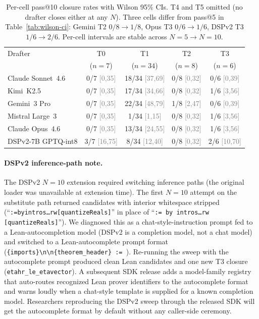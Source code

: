 \begin{table}[!t]
\centering
\small
\caption{Per-cell pass@10 closure rates with Wilson 95\% CIs.
T4 and T5 omitted (no drafter closes either at any $N$). Three
cells differ from pass@5 in Table~\ref{tab:wilson-ci}: Gemini T2
$0/8 \to 1/8$, Opus T3 $0/6 \to 1/6$, DSPv2 T3 $1/6 \to 2/6$.
Per-cell intervals are stable across $N=5 \to N=10$.}
\label{tab:wilson-ci-n10}
\begin{tabular}{l|cccc}
\toprule
Drafter & T0 & T1 & T2 & T3 \\
& ($n=7$) & ($n=34$) & ($n=8$) & ($n=6$) \\
\midrule
Claude Sonnet~4.6 & 0/7 \textcolor{gray}{[0,35]} & 18/34 \textcolor{gray}{[37,69]} & 0/8 \textcolor{gray}{[0,32]} & 0/6 \textcolor{gray}{[0,39]} \\
Kimi~K2.5 & 0/7 \textcolor{gray}{[0,35]} & 17/34 \textcolor{gray}{[34,66]} & 0/8 \textcolor{gray}{[0,32]} & 1/6 \textcolor{gray}{[3,56]} \\
Gemini~3 Pro & 0/7 \textcolor{gray}{[0,35]} & 22/34 \textcolor{gray}{[48,79]} & 1/8 \textcolor{gray}{[2,47]} & 0/6 \textcolor{gray}{[0,39]} \\
Mistral Large~3 & 0/7 \textcolor{gray}{[0,35]} & 1/34 \textcolor{gray}{[1,15]} & 0/8 \textcolor{gray}{[0,32]} & 1/6 \textcolor{gray}{[3,56]} \\
Claude Opus~4.6 & 0/7 \textcolor{gray}{[0,35]} & 13/34 \textcolor{gray}{[24,55]} & 0/8 \textcolor{gray}{[0,32]} & 1/6 \textcolor{gray}{[3,56]} \\
DSPv2-$7$B GPTQ-int$8$ & 3/7 \textcolor{gray}{[16,75]} & 8/34 \textcolor{gray}{[12,40]} & 0/8 \textcolor{gray}{[0,32]} & 2/6 \textcolor{gray}{[10,70]} \\
\bottomrule
\end{tabular}

\end{table}

\paragraph{DSPv2 inference-path note.}
The DSPv2 $N=10$ extension required switching inference paths
(the original loader was unavailable at extension time). The first
$N=10$ attempt on the substitute path returned candidates with
interior whitespace stripped
(``\texttt{:=byintros\dots rw[quantizeReals]}'' in place of
``\texttt{:= by intros\dots rw [quantizeReals]}''). We diagnosed
this as a chat-style-instruction prompt fed to a Lean-autocompletion
model (DSPv2 is a completion model, not a chat model) and switched
to a Lean-autocomplete prompt format
(\texttt{\{imports\}\textbackslash n\textbackslash n\{theorem\_header\} := }).
Re-running the sweep with the autocomplete prompt produced clean
Lean candidates and one new T3 closure
(\texttt{etahr\_le\_etavector}). A subsequent SDK release adds a
model-family registry that auto-routes recognized Lean prover
identifiers to the autocomplete format and warns loudly when a
chat-style template is supplied for a known completion model.
Researchers reproducing the DSPv2 sweep through the released SDK
will get the autocomplete format by default without any
caller-side ceremony.

